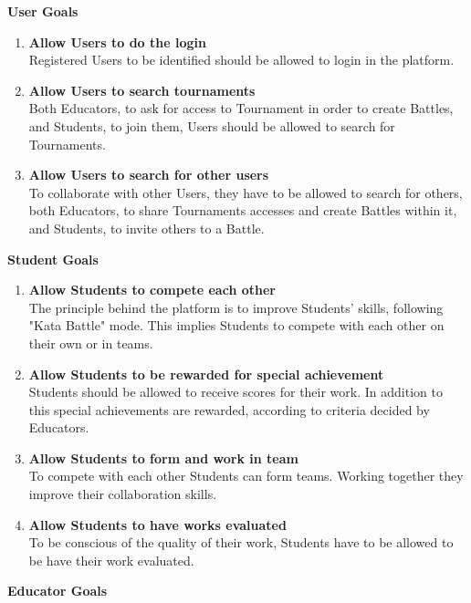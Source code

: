 \textbf{User Goals}
    \begin{enumerate}[label=$\bullet$ \textbf{GU\arabic*:}]
        \item \textbf{Allow Users to do the login}\\Registered Users to be identified should be allowed to login in the platform.
        \item \textbf{Allow Users to search tournaments}\\Both Educators, to ask for access to Tournament in order to create Battles, and Students, to join them, Users should be allowed to search for Tournaments.
        \item \textbf{Allow Users to search for other users}\\To collaborate with other Users, they have to be allowed to search for others, both Educators, to share Tournaments accesses and create Battles within it, and Students, to invite others to a Battle.
    \end{enumerate}
\textbf{Student Goals}
\begin{enumerate}[label=$\bullet$ \textbf{GS\arabic*:}]
    \item \textbf{Allow Students to compete each other}\\The principle behind the platform is to improve Students' skills, following "Kata Battle" mode. This implies Students to compete with each other on their own or in teams.
    \item \textbf{Allow Students to be rewarded for special achievement}\\Students should be allowed to receive scores for their work. In addition to this special achievements are rewarded, according to criteria decided by Educators.
    \item \textbf{Allow Students to form and work in team}\\To compete with each other Students can form teams. Working together they improve their collaboration skills.
    \item \textbf{Allow Students to have works evaluated}\\To be conscious of the quality of their work, Students have to be allowed to be have their work evaluated.
\end{enumerate}
\textbf{Educator Goals}

